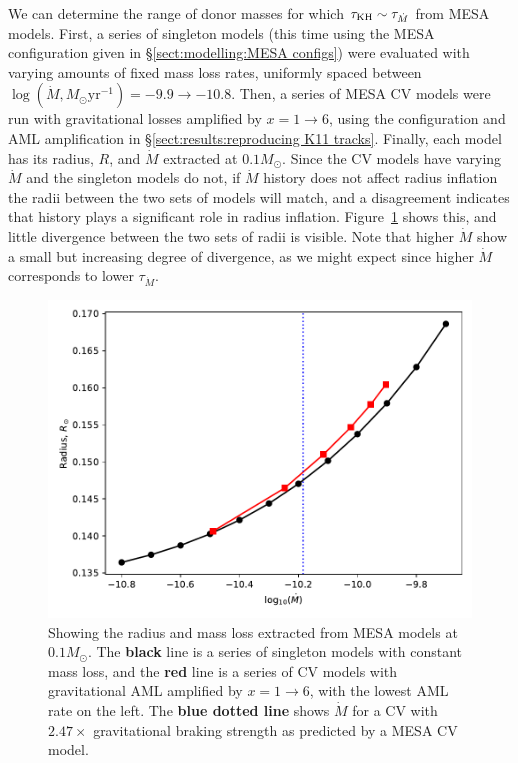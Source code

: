 We can determine the range of donor masses for which $\tau_{\rm KH} \sim \tau_{\dot M}$ from MESA models.
First, a series of singleton models (this time using the MESA configuration given in \S\ref{sect:modelling:MESA configs}) were evaluated with varying amounts of fixed mass loss rates, uniformly spaced between $\log (\dot M, M_\odot \mathrm{yr}^{-1}) = -9.9 \rightarrow -10.8$.
Then, a series of MESA CV models were run with gravitational losses amplified by $x = 1 \rightarrow 6$, using the configuration and AML amplification in \S\ref{sect:results:reproducing K11 tracks}.
Finally, each model has its radius, $R$, and $\dot M$ extracted at $0.1 M_\odot$. Since the CV models have varying $\dot M$ and the singleton models do not, if $\dot M$ history does not affect radius inflation the radii between the two sets of models will match, and a disagreement indicates that history plays a significant role in radius inflation.
 Figure~\ref{fig:results:comparing radii at 0.1Msun} shows this, and little divergence between the two sets of radii is visible. Note that higher $\dot M$ show a small but increasing degree of divergence, as we might expect since higher $\dot M$ corresponds to lower $\tau_{\dot M}$.
\begin{figure}
    \centering
    \includegraphics[width=.8\textwidth]{figures/modelling/compare_0.1Msun_with_CV_track_K11_fig1.pdf}
    \caption{Showing the radius and mass loss extracted from MESA models at $0.1 M_\odot$. The {\bf black} line is a series of singleton models with constant mass loss, and the {\bf red} line is a series of CV models with gravitational AML amplified by $x = 1 \rightarrow 6$, with the lowest AML rate on the left. The {\bf blue dotted line} shows $\dot M$ for a CV with $2.47\times$ gravitational braking strength as predicted by a MESA CV model.}
    \label{fig:results:comparing radii at 0.1Msun}
\end{figure}

